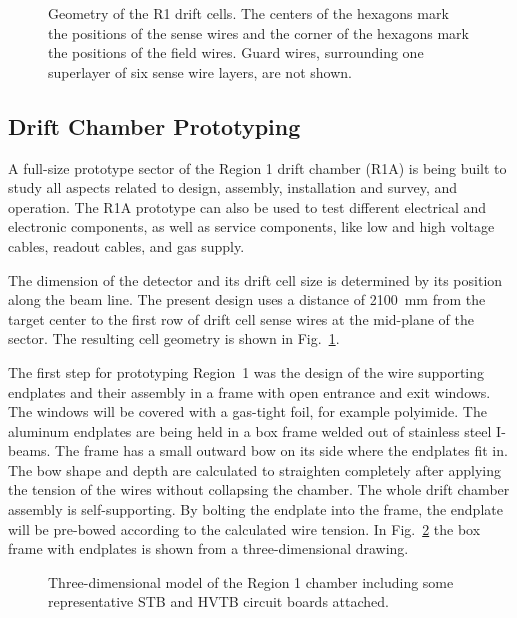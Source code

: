 \begin{figure}[htpb]
\vspace{6.2cm} 
\caption{\small{Geometry of the R1 drift cells. The centers of the hexagons mark 
the positions of the sense wires and the corner of the hexagons mark the 
positions of the field wires.  Guard wires, surrounding one superlayer of six 
sense wire layers, are not shown.}}
\label{proto:cellsize}
\end{figure}

\subsection{Drift Chamber Prototyping}

A full-size prototype sector of the Region 1 drift chamber (R1A) is being built 
to study all aspects related to design, assembly, installation and survey, and 
operation.  The R1A prototype can also be used to test different electrical and 
electronic components, as well as service components, like low and high voltage 
cables, readout cables, and gas supply.

The dimension of the detector and its drift cell size is determined by its
position along the beam line.  The present design uses a distance of 2100~mm 
from the target center to the first row of drift cell sense wires at the 
mid-plane of the sector.  The resulting cell geometry is shown in 
Fig.~\ref{proto:cellsize}.

The first step for prototyping Region~1 was the design of the wire supporting 
endplates and their assembly in a frame with open entrance and exit windows.  
The windows will be covered with a gas-tight foil, for example polyimide.
The aluminum endplates are being held in a box frame welded out of stainless 
steel I-beams.  The frame has a small outward bow on its side where the 
endplates fit in.  The bow shape and depth are calculated to straighten 
completely after applying the tension of the wires without collapsing the 
chamber. The whole drift chamber assembly is self-supporting.  By bolting the 
endplate into the frame, the endplate will be pre-bowed according to the 
calculated wire tension.  In Fig.~\ref{proto:r1} the box frame with endplates 
is shown from a three-dimensional drawing.

\begin{figure}[htpb]
\vspace{9.0cm} 
\caption{\small{Three-dimensional model of the Region 1 chamber including
some representative STB and HVTB circuit boards attached.}}
\label{proto:r1}
\end{figure}


